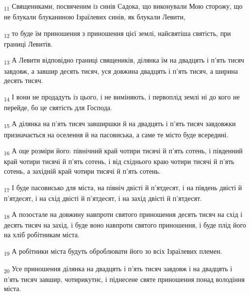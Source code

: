 \begin{tcolorbox}
\textsubscript{11} Священиками, посвяченим із синів Садока, що виконували Мою сторожу, що не блукали блуканиною Ізраїлевих синів, як блукали Левити,
\end{tcolorbox}
\begin{tcolorbox}
\textsubscript{12} то буде їм приношення з приношення цієї землі, найсвятіша святість, при границі Левитів.
\end{tcolorbox}
\begin{tcolorbox}
\textsubscript{13} А Левити відповідно границі священиків, ділянка їм на двадцять і п'ять тисяч завдовж, а завшир десять тисяч, уся довжина двадцять і п'ять тисяч, а ширина десять тисяч.
\end{tcolorbox}
\begin{tcolorbox}
\textsubscript{14} І вони не продадуть із цього, і не виміняють, і первоплід землі ні до кого не перейде, бо це святість для Господа.
\end{tcolorbox}
\begin{tcolorbox}
\textsubscript{15} А ділянка на п'ять тисяч завширшки й на двадцять і п'ять тисяч завдовжки призначається на оселення й на пасовиська, а саме те місто буде всередині.
\end{tcolorbox}
\begin{tcolorbox}
\textsubscript{16} А оце розміри його: північний край чотири тисячі й п'ять сотень, і південний край чотири тисячі й п'ять сотень, і від східнього краю чотири тисячі й п'ять сотень, а західній край чотири тисячі й п'ять сотень.
\end{tcolorbox}
\begin{tcolorbox}
\textsubscript{17} І буде пасовисько для міста, на північ двісті й п'ятдесят, і на південь двісті й п'ятдесят, і на схід двісті й п'ятдесят, і на захід двісті й п'ятдесят.
\end{tcolorbox}
\begin{tcolorbox}
\textsubscript{18} А позостале на довжину навпроти святого приношення десять тисяч на схід і десять тисяч на захід, і буде воно навпроти святого приношення, і буде плід його на хліб робітникам міста.
\end{tcolorbox}
\begin{tcolorbox}
\textsubscript{19} А робітники міста будуть оброблювати його зо всіх Ізраїлевих племен.
\end{tcolorbox}
\begin{tcolorbox}
\textsubscript{20} Усе приношення ділянка на двадцять і п'ять тисяч завдовж і на двадцять і п'ять тисяч завшир, чотирикутнє, і піднесене святе приношення понад володіння міста.
\end{tcolorbox}
